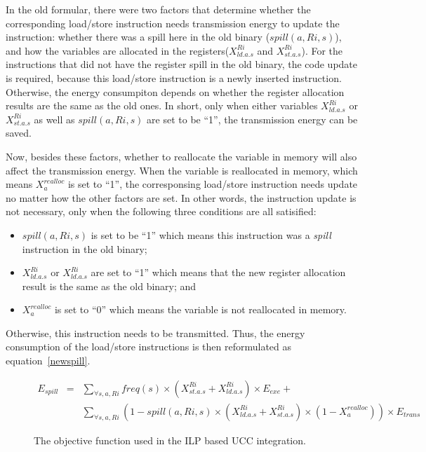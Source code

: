 In the old formular, there were two factors that determine whether the corresponding load/store instruction needs 
transmission energy
to update the instruction:
whether there was a spill here in the old binary ($spill(a,Ri,s)$), and how the variables are allocated in the 
registers($X_{ld.a.s}^{Ri}$ and $X_{st.a.s}^{Ri}$).
For the instructions that did not have the register spill in the old binary, the code
update is required, because this load/store instruction is a newly inserted instruction.
Otherwise, the energy consumpiton depends on whether the register allocation results
are the same as the old ones.
In short, only when either variables $X_{ld.a.s}^{Ri}$ or $X_{st.a.s}^{Ri}$ as well as $spill(a,Ri,s)$
are set to be ``1'', the transmission energy can be saved.

Now, besides these factors, whether to reallocate the variable in memory will also
affect the transmission energy.
When the variable is reallocated in memory, which means $X_{a}^{realloc}$
is set to ``1'', the corresponsing load/store instruction needs update
no matter how the other factors are set.
In other words, the instruction update is not necessary, 
only when the following three conditions are all satisified:
\begin{itemize}
	\item $spill(a,Ri,s)$ is set to be ``1'' which means this instruction was a 
{\it spill} instruction in the old binary;
	\item $X_{ld.a.s}^{Ri}$ or $X_{ld.a.s}^{Ri}$ are set to ``1'' which means that the new
register allocation result is the same as the old binary; and
	\item  $X_{a}^{realloc}$
is set to ``0'' which means the variable is not reallocated in memory.
\end{itemize}
Otherwise, this instruction needs to be transmitted.
Thus, the energy consumption of the load/store instructions is then reformulated as equation~\ref{newspill}.

\begin{figure}[ht]
\begin{small}
\begin{eqnarray}
E_{spill} &=& \sum_{\forall s, a, Ri}
freq(s) \times (X_{st.a.s}^{Ri}+X_{ld.a.s}^{Ri}) \times E_{exe} + \nonumber\\
					& & \sum_{\forall s, a, Ri}(1-spill(a,Ri,s)\times
 (X_{ld.a.s}^{Ri}+X_{st.a.s}^{Ri})\times (1-X_{a}^{realloc}))\times E_{trans} \label{newspill} 
\end{eqnarray}
\end{small}
\caption{The objective function used in the ILP based UCC integration.}
\end{figure}


